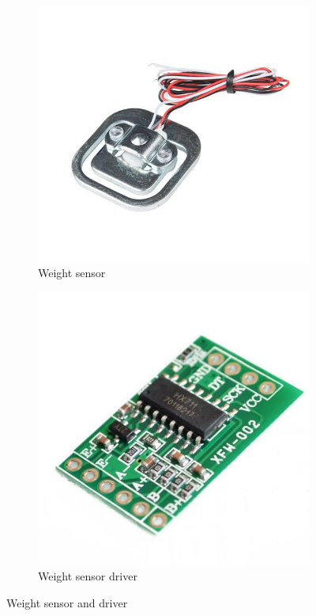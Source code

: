 \begin{figure}[h]
     \centering
     \begin{subfigure}[b]{0.49\linewidth}
     \includegraphics[width=\linewidth]{content/loadsensor.jpeg}
     \caption{Weight sensor}
     \label{fig:loadsensor}
     \end{subfigure}
     \begin{subfigure}[b]{0.49\linewidth}
     \includegraphics[width=\linewidth]{content/loadsensordriver.jpeg}
     \caption {Weight sensor driver}
     \label{fig:loadsensordriver}
     \end{subfigure}
     \caption{Weight sensor and driver}
     \label{fig:sensorsWeight1}
\end{figure}

